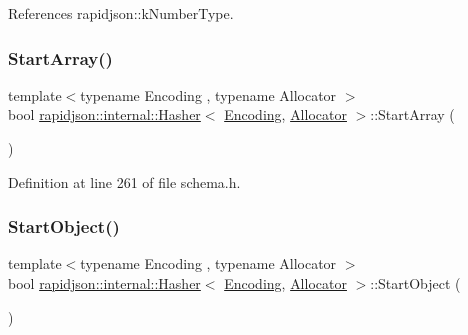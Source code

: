 References rapidjson\+::k\+Number\+Type.

\mbox{\label{classrapidjson_1_1internal_1_1_hasher_a37b1cc8f2402d5911d7e9c7cfb5ec5e9}} 
\subsubsection{\texorpdfstring{StartArray()}{StartArray()}}
{\footnotesize\ttfamily template$<$typename Encoding , typename Allocator $>$ \\
bool \mbox{\hyperlink{classrapidjson_1_1internal_1_1_hasher}{rapidjson\+::internal\+::\+Hasher}}$<$ \mbox{\hyperlink{classrapidjson_1_1_encoding}{Encoding}}, \mbox{\hyperlink{classrapidjson_1_1_allocator}{Allocator}} $>$\+::Start\+Array (\begin{DoxyParamCaption}{ }\end{DoxyParamCaption})}



Definition at line 261 of file schema.\+h.


\begin{DoxyCode}{0}

\end{DoxyCode}
\mbox{\label{classrapidjson_1_1internal_1_1_hasher_ae0e68c1bca3afd6e7936a3943a804378}} 
\subsubsection{\texorpdfstring{StartObject()}{StartObject()}}
{\footnotesize\ttfamily template$<$typename Encoding , typename Allocator $>$ \\
bool \mbox{\hyperlink{classrapidjson_1_1internal_1_1_hasher}{rapidjson\+::internal\+::\+Hasher}}$<$ \mbox{\hyperlink{classrapidjson_1_1_encoding}{Encoding}}, \mbox{\hyperlink{classrapidjson_1_1_allocator}{Allocator}} $>$\+::Start\+Object (\begin{DoxyParamCaption}{ }\end{DoxyParamCaption})}



